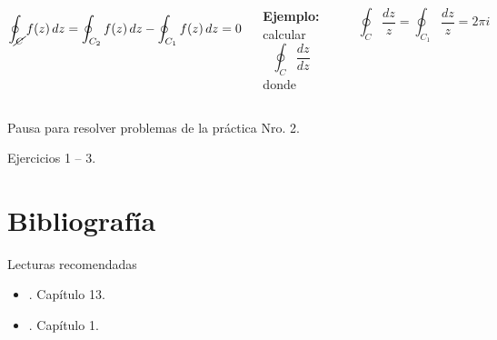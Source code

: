 \documentclass[9pt, aspectratio=169]{beamer}
\begin{document}
\begin{frame}
\begin{columns}[t]
 \cx
 \[\oint_{\cancel{C}} f(z) \, dz = \oint_{C_2} f(z) \, dz - \oint_{C_1} f(z) \, dz = 0 \]

 \textbf{Ejemplo:} calcular
 \[ \oint_C \frac{dz}{dz} \]
 donde
  \begin{center}
      \includegraphics[scale=0.40]{figs/fig-05.pdf}
  \end{center}

  \[ \oint_C \frac{dz}{z} = \oint_{C_1} \frac{dz}{z} = 2 \pi i \]

\end{columns}
\end{frame}

\begin{frame}[standout]
    \begin{center}
        Pausa para resolver problemas de la práctica Nro. 2.

        Ejercicios 1 -- 3. 
    \end{center}
\end{frame}

\section*{Bibliografía}
\begin{frame}[allowframebreaks]{Lecturas recomendadas}
\begin{itemize}
 \item {}. Capítulo 13.
 \item {}. Capítulo 1.
\end{itemize}

\end{frame}
\end{document}
